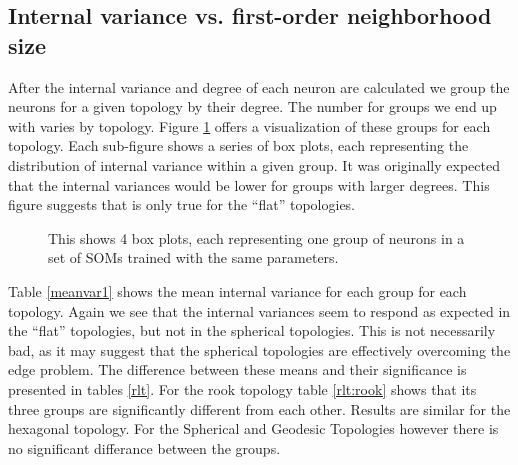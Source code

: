 \subsection{Internal variance vs. first-order neighborhood size}
After the internal variance and degree of each neuron are calculated we
group the neurons for a given topology by their degree. The number for groups
we end up with varies by topology. Figure \ref{boxplot} offers a visualization
of these groups for each topology.  Each sub-figure shows a series of box
plots, each representing the distribution of internal variance within a given
group.  It was originally expected that the internal variances would be lower
for groups with larger degrees. This figure suggests that is only true for the
``flat'' topologies.

\begin{figure}[hbt]
\centering
{}
\caption{This shows 4 box plots, each representing one group of neurons in a set
of SOMs trained with the same parameters.}
\label{boxplot}
\end{figure}

Table \ref{meanvar1} shows the mean internal variance for each group for each
topology. Again we see that the internal variances seem to respond as expected
in the ``flat'' topologies, but not in the spherical topologies.  This is not
necessarily bad, as it may suggest that the spherical topologies are
effectively overcoming the edge problem.  The difference between these means
and their significance is presented in tables \ref{rlt}.  For the rook
topology table \ref{rlt:rook} shows that its three groups are significantly
different from each other. Results are similar for the hexagonal topology. For
the Spherical and Geodesic Topologies however there is no significant
differance between the groups.

